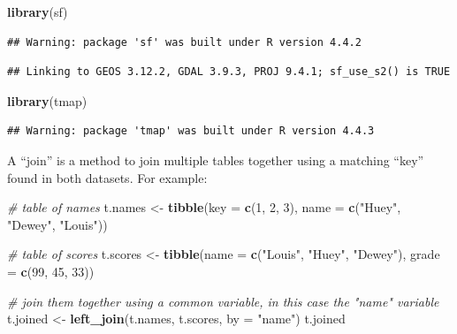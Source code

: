 \documentclass[
]{article}
\newenvironment{Shaded}{\begin{snugshade}}{\end{snugshade}}
\newcommand{\AttributeTok}[1]{\textcolor[rgb]{0.13,0.29,0.53}{#1}}
\newcommand{\CommentTok}[1]{\textcolor[rgb]{0.56,0.35,0.01}{\textit{#1}}}
\newcommand{\DecValTok}[1]{\textcolor[rgb]{0.00,0.00,0.81}{#1}}
\newcommand{\FunctionTok}[1]{\textcolor[rgb]{0.13,0.29,0.53}{\textbf{#1}}}
\newcommand{\NormalTok}[1]{#1}
\newcommand{\OtherTok}[1]{\textcolor[rgb]{0.56,0.35,0.01}{#1}}
\newcommand{\StringTok}[1]{\textcolor[rgb]{0.31,0.60,0.02}{#1}}
\begin{document}
\begin{Shaded}
\begin{Highlighting}[]
\FunctionTok{library}\NormalTok{(sf)}
\end{Highlighting}
\end{Shaded}

\begin{verbatim}
## Warning: package 'sf' was built under R version 4.4.2
\end{verbatim}

\begin{verbatim}
## Linking to GEOS 3.12.2, GDAL 3.9.3, PROJ 9.4.1; sf_use_s2() is TRUE
\end{verbatim}

\begin{Shaded}
\begin{Highlighting}[]
\FunctionTok{library}\NormalTok{(tmap)}
\end{Highlighting}
\end{Shaded}

\begin{verbatim}
## Warning: package 'tmap' was built under R version 4.4.3
\end{verbatim}

A ``join'' is a method to join multiple tables together using a matching
``key'' found in both datasets. For example:

\begin{Shaded}
\begin{Highlighting}[]
\CommentTok{\# table of names}
\NormalTok{t.names }\OtherTok{\textless{}{-}} \FunctionTok{tibble}\NormalTok{(}\AttributeTok{key =} \FunctionTok{c}\NormalTok{(}\DecValTok{1}\NormalTok{, }\DecValTok{2}\NormalTok{, }\DecValTok{3}\NormalTok{), }
             \AttributeTok{name =} \FunctionTok{c}\NormalTok{(}\StringTok{"Huey"}\NormalTok{, }\StringTok{"Dewey"}\NormalTok{, }\StringTok{"Louis"}\NormalTok{))}

\CommentTok{\# table of scores}
\NormalTok{t.scores }\OtherTok{\textless{}{-}} \FunctionTok{tibble}\NormalTok{(}\AttributeTok{name =} \FunctionTok{c}\NormalTok{(}\StringTok{"Louis"}\NormalTok{, }\StringTok{"Huey"}\NormalTok{, }\StringTok{"Dewey"}\NormalTok{),}
                   \AttributeTok{grade =} \FunctionTok{c}\NormalTok{(}\DecValTok{99}\NormalTok{, }\DecValTok{45}\NormalTok{, }\DecValTok{33}\NormalTok{))}

\CommentTok{\# join them together using a common variable, in this case the "name" variable}
\NormalTok{t.joined }\OtherTok{\textless{}{-}} \FunctionTok{left\_join}\NormalTok{(t.names, t.scores, }\AttributeTok{by =} \StringTok{"name"}\NormalTok{)}
\NormalTok{t.joined}
\end{Highlighting}
\end{Shaded}
\end{document}
